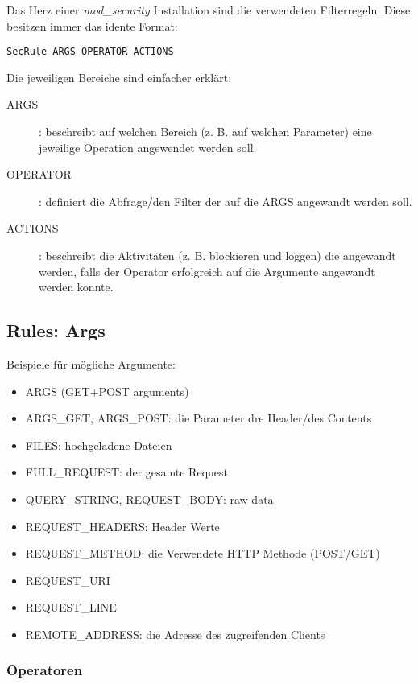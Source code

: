Das Herz einer \textit{mod\_security} Installation sind die verwendeten Filterregeln. Diese besitzen immer das idente Format:

\begin{verbatim}
SecRule ARGS OPERATOR ACTIONS
\end{verbatim}

Die jeweiligen Bereiche sind einfacher erklärt:

\begin{description}
	\item[ARGS]: beschreibt auf welchen Bereich (z. B. auf welchen Parameter) eine jeweilige Operation angewendet werden soll.
	\item[OPERATOR]: definiert die Abfrage/den Filter der auf die ARGS angewandt werden soll.
	\item[ACTIONS]: beschreibt die Aktivitäten (z. B. blockieren und loggen) die angewandt werden, falls der Operator erfolgreich auf die Argumente angewandt werden konnte.
\end{description}

\subsection{Rules: Args}

Beispiele für mögliche Argumente:

\begin{itemize}
	\item ARGS (GET+POST arguments)
	\item ARGS\_GET, ARGS\_POST: die Parameter dre Header/des Contents
	\item FILES: hochgeladene Dateien
	\item FULL\_REQUEST: der gesamte Request
	\item QUERY\_STRING, REQUEST\_BODY: raw data
	\item REQUEST\_HEADERS: Header Werte
	\item REQUEST\_METHOD: die Verwendete HTTP Methode (POST/GET)
	\item REQUEST\_URI
	\item REQUEST\_LINE
	\item REMOTE\_ADDRESS: die Adresse des zugreifenden Clients
\end{itemize}

\subsubsection{Operatoren}

